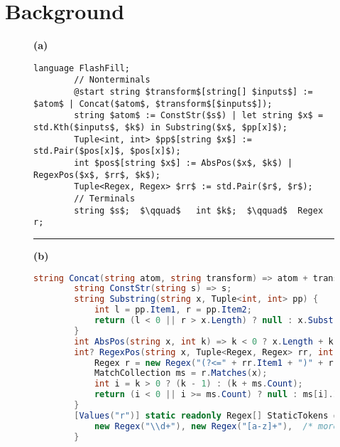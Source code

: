 \chapter{Background}
\label{ch:background}

\begin{figure*}
    \centering
    \lstset{basicstyle = \footnotesize\ttfamily}
    \def\baselinestretch{1.05}
    \begin{subfigure}{\textwidth}
    \hfill\textbf{(a)}\vspace{-0.8\baselineskip}
    \begin{lstlisting}[language=dsl,gobble=8,morekeywords={Regex}]
        language FlashFill;
        // Nonterminals
        @start string $transform$[string[] $inputs$] := $atom$ | Concat($atom$, $transform$[$inputs$]);
        string $atom$ := ConstStr($s$) | let string $x$ = std.Kth($inputs$, $k$) in Substring($x$, $pp[x]$);
        Tuple<int, int> $pp$[string $x$] := std.Pair($pos[x]$, $pos[x]$);
        int $pos$[string $x$] := AbsPos($x$, $k$) | RegexPos($x$, $rr$, $k$);
        Tuple<Regex, Regex> $rr$ := std.Pair($r$, $r$);
        // Terminals
        string $s$;  $\qquad$   int $k$;  $\qquad$  Regex r;
    \end{lstlisting}
    \end{subfigure}
    \begin{subfigure}{\textwidth}
    \hrule
    \vspace{5pt}
    \hfill\textbf{(b)}
    \vspace{-0.9\baselineskip}
    \begin{lstlisting}[language=csharp,gobble=8,breaklines=false,morekeywords={Tuple}]
        string Concat(string atom, string transform) => atom + transform;
        string ConstStr(string s) => s;
        string Substring(string x, Tuple<int, int> pp) {
            int l = pp.Item1, r = pp.Item2;
            return (l < 0 || r > x.Length) ? null : x.Substring(l, r - l);
        }
        int AbsPos(string x, int k) => k < 0 ? x.Length + k + 1 : k;
        int? RegexPos(string x, Tuple<Regex, Regex> rr, int k) {
            Regex r = new Regex("(?<=" + rr.Item1 + ")" + rr.Item2);
            MatchCollection ms = r.Matches(x);
            int i = k > 0 ? (k - 1) : (k + ms.Count);
            return (i < 0 || i >= ms.Count) ? null : ms[i].Index;
        }
        [Values("r")] static readonly Regex[] StaticTokens = {
            new Regex("\\d+"), new Regex("[a-z]+"),  /* more tokens... */
        }
    \end{lstlisting}

\end{subfigure}
\end{figure*}
